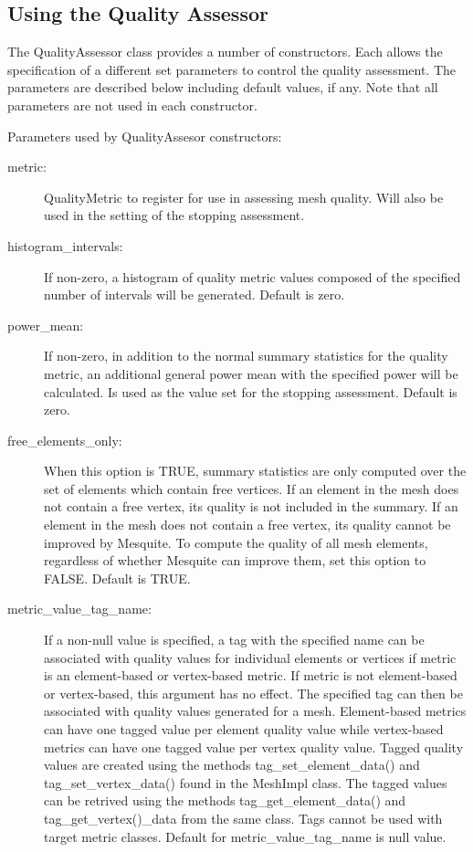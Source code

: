 \subsection{Using the Quality Assessor}

  The QualityAssessor class provides a number of constructors.  Each allows the specification of a different set parameters to control the quality assessment.  The parameters are described below including default values, if any. Note that all parameters are not used in each constructor.

\label{QA_params}
Parameters used by QualityAssesor constructors:
\begin{description}
\item[metric:]   QualityMetric to register for use in assessing mesh quality.  Will also be used in the setting of the stopping assessment.

\item[histogram\_intervals:]   If non-zero, a histogram of quality metric values composed of the specified number of intervals will be generated.  Default is zero.
\item[power\_mean:] If non-zero, in addition to the normal summary statistics for the quality metric, an additional general power mean with the specified power will be calculated.  Is used as the value set for the stopping assessment.  Default is zero.

\item[free\_elements\_only:] When this option is TRUE, summary statistics are only computed over the set of elements which contain free vertices. If an element in the mesh does not contain a free vertex, its quality is not included in the summary.  If an element in the mesh does not contain a free vertex, its quality cannot be improved by Mesquite.  To compute the quality of all mesh elements, regardless of whether Mesquite can improve them, set this option to FALSE.  Default is TRUE.

\item[metric\_value\_tag\_name:] If a non-null value is specified, a tag with the specified name can be associated with quality values for individual elements or vertices if metric is an element-based or vertex-based metric.  If metric is not element-based or vertex-based, this argument has no effect. The specified tag can then be associated with quality values generated for a mesh.  Element-based metrics can have one tagged value per element quality value while vertex-based metrics can have one tagged value per vertex quality value.  Tagged quality values are created using the methods tag\_set\_element\_data() and tag\_set\_vertex\_data() found in the MeshImpl class. The tagged values can be retrived using the methods tag\_get\_element\_data() and tag\_get\_vertex()\_data from the same class.  Tags cannot be used with target metric classes. Default for metric\_value\_tag\_name is null value.


\end{description}
